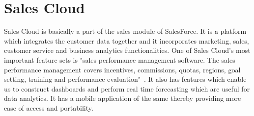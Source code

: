 \section{Sales Cloud}

Sales Cloud is basically a part of the sales module of SalesForce. It is a 
platform which integrates the customer data together and it incorporates 
marketing, sales, customer service and business analytics functionalities.
One of Sales Cloud’s most important feature sets is "sales performance 
management software. The sales performance management covers incentives,
commissions, quotas, regions, goal setting, training and performance
evaluation"~\cite{hid-sp18-418-Sales-Cloud-features}. It also has features 
which enable us to construct dashboards and perform real time forecasting 
which are useful for data analytics. It has a mobile application of the same 
thereby providing more ease of access and portability.
